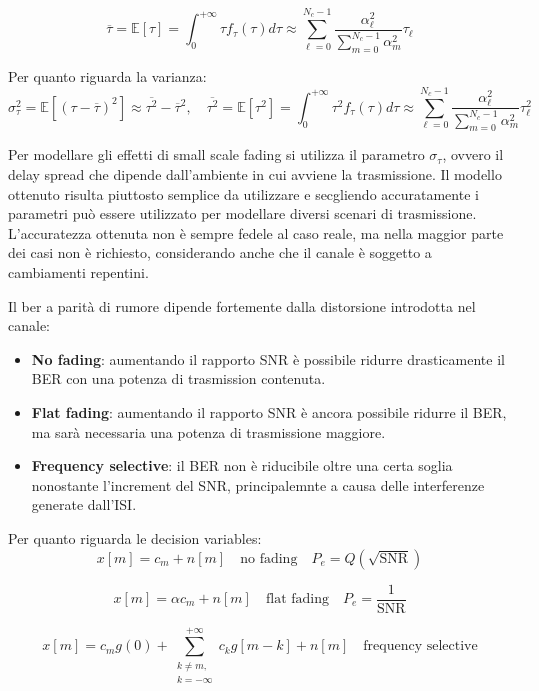 \[
   \overline{\tau} = \mathbb{E} \left[\tau\right] = \int_{0}^{+\infty} \tau f_{\tau}(\tau) d\tau \approx \sum_{\ell=0}^{N_c-1} \frac{\alpha_{\ell}^2}{\sum_{m=0}^{N_c-1} \alpha_{m}^2} \tau_{\ell}
\]

Per quanto riguarda la varianza:
\[  
    \sigma_\tau^2 = \mathbb{E}\left[({\tau - \overline{\tau}})^2\right] \approx \overline{\tau^2} - \overline{\tau}^2, \quad \overline{\tau^2} = \mathbb{E} \left[\tau^2\right] = \int_{0}^{+\infty} \tau^2 f_{\tau}(\tau) d\tau \approx \sum_{\ell=0}^{N_c-1} \frac{\alpha_{\ell}^2}{\sum_{m=0}^{N_c-1} \alpha_{m}^2} \tau_{\ell}^2
\]

Per modellare gli effetti di small scale fading si utilizza il parametro $\sigma_\tau$, ovvero il delay spread che dipende dall'ambiente in cui avviene la trasmissione. Il modello ottenuto risulta piuttosto semplice da utilizzare e secgliendo accuratamente i parametri può essere utilizzato per modellare diversi scenari di trasmissione. L'accuratezza ottenuta non è sempre fedele al caso reale, ma nella maggior parte dei casi non è richiesto, considerando anche che il canale è soggetto a cambiamenti repentini.

Il ber a parità di rumore dipende fortemente dalla distorsione introdotta nel canale:
\begin{itemize}
    \item \textbf{No fading}: aumentando il rapporto SNR è possibile ridurre drasticamente il BER con una potenza di trasmission contenuta.
    \item \textbf{Flat fading}: aumentando il rapporto SNR è ancora possibile ridurre il BER, ma sarà necessaria una potenza di trasmissione maggiore.
    \item \textbf{Frequency selective}: il BER non è riducibile oltre una certa soglia nonostante l'increment del SNR, principalemnte a causa delle interferenze generate dall'ISI.
\end{itemize}

Per quanto riguarda le decision variables:
\[
    x\left[m\right] = c_m + n\left[m\right] \quad \text{no fading} \quad P_e = Q(\sqrt{\text{SNR}})
\]

\[
    x\left[m\right] = \alpha c_m + n\left[m\right] \quad \text{flat fading} \quad P_e = \frac{1}{\text{SNR}}
\]

\[
    x\left[m\right] = c_m g(0) + \sum_{\substack{k \neq m,\\ k=-\infty}}^{+\infty} c_{k} g\left[m-k\right] + n\left[m\right] \quad \text{frequency selective}  
\]

